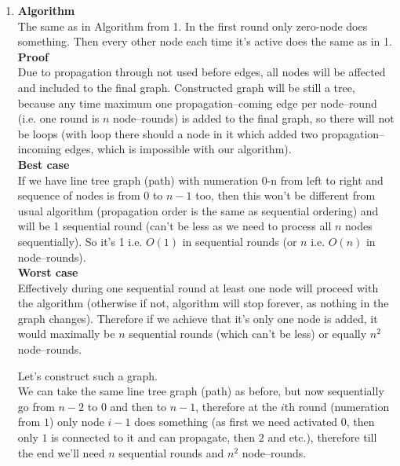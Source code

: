 \documentclass[]{article}
\begin{document}
\begin{enumerate}
	
	\item 
	 \textbf{Algorithm}\\
	 The same as in Algorithm from 1. In the first round only zero-node does something. Then every other node each time it's active does the same as in 1.\\ 
	\textbf{Proof}\\ 
	Due to propagation through not used before edges, all nodes will be affected and included to the final graph. Constructed graph will be still a tree, because any time maximum one propagation--coming edge per node--round (i.e. one round is $n$ node--rounds) is added to the final graph, so there will not be loops (with loop there should a node in it which added two propagation--incoming edges, which is impossible with our algorithm).\\
	
	\textbf{Best case}\\
	If we have line tree graph (path) with numeration 0-n from left to right and sequence of nodes is from $0$ to $n-1$ too, then this won't be different from usual algorithm (propagation order is the same as sequential ordering) and will be 1 sequential round (can't be less as we need to process all $n$ nodes sequentially). So it's 1 i.e. $O(1)$ in sequential rounds (or $n$ i.e. $O(n)$ in node--rounds).\\
	\textbf{Worst case}\\
	Effectively during one sequential round at least one node will proceed with the algorithm (otherwise if not, algorithm will stop forever, as nothing in the graph changes). Therefore if we achieve that it's only one node is added, it would maximally be $n$ sequential rounds (which can't be less) or equally $n^2$ node--rounds.
	
	Let's construct such a graph.\\
	We can take the same line tree graph (path) as before, but now sequentially go from $n-2$ to $0$ and then to $n-1$, therefore at the $i$th round (numeration from $1$) only node $i-1$ does something (as first we need activated $0$, then only $1$ is connected to it and can propagate, then $2$ and etc.), therefore till the end we'll need $n$ sequential rounds and $n^2$ node--rounds.
\end{enumerate}
\end{document}
